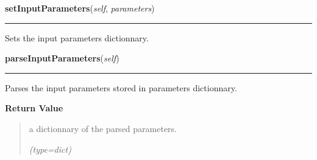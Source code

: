     \vspace{0.5ex}

\hspace{.8\funcindent}\begin{boxedminipage}{\funcwidth}

    \raggedright \textbf{setInputParameters}(\textit{self}, \textit{parameters})

    \vspace{-1.5ex}

    \rule{\textwidth}{0.5\fboxrule}
\setlength{\parskip}{2ex}
    Sets the input parameters dictionnary.

\setlength{\parskip}{1ex}
    \end{boxedminipage}

    \label{nMOLDYN:Analysis:Analysis:Analysis:parseInputParameters}

    \vspace{0.5ex}

\hspace{.8\funcindent}\begin{boxedminipage}{\funcwidth}

    \raggedright \textbf{parseInputParameters}(\textit{self})

    \vspace{-1.5ex}

    \rule{\textwidth}{0.5\fboxrule}
\setlength{\parskip}{2ex}
    Parses the input parameters stored in {\textbar}parameters{\textbar} 
    dictionnary.

\setlength{\parskip}{1ex}
      \textbf{Return Value}
    \vspace{-1ex}

      \begin{quote}
      a dictionnary of the parsed parameters.

      {\it (type=dict)}

      \end{quote}

    \end{boxedminipage}

    \label{nMOLDYN:Analysis:Analysis:Analysis:buildTimeInfo}

